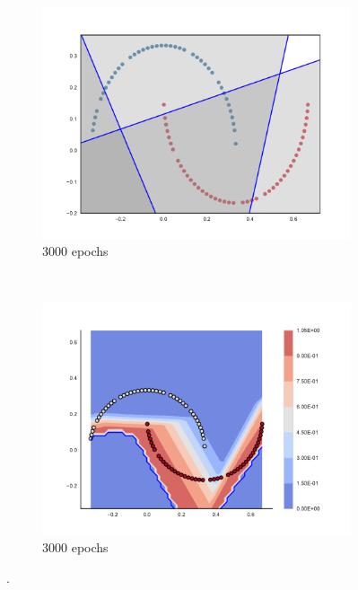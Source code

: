 \begin{figure}
    \\
    \begin{subfigure}[b]{0.3\textwidth}
        \includegraphics[width=\textwidth]{img/zero/3000/09-conv2d_1-0.pdf}
        \caption{3000 epochs}
        \label{fig:zerosInput3000}
    \end{subfigure}
    ~ %
    \begin{subfigure}[b]{0.3\textwidth}
        \includegraphics[width=\textwidth]{img/zero/3000/57-09-output.pdf}
        \caption{3000 epochs}
        \label{fig:zerosOutput3000}
    \end{subfigure}
    
      
  \caption{.} 
  \label{fig:zeros} 
\end{figure}


